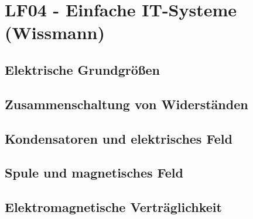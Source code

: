 \section{LF04 - Einfache IT-Systeme (Wissmann)}
%
\subsection{Elektrische Grundgrößen}
\subsection{Zusammenschaltung von Widerständen}
\subsection{Kondensatoren und elektrisches Feld}
\subsection{Spule und magnetisches Feld}
\subsection{Elektromagnetische Verträglichkeit}
